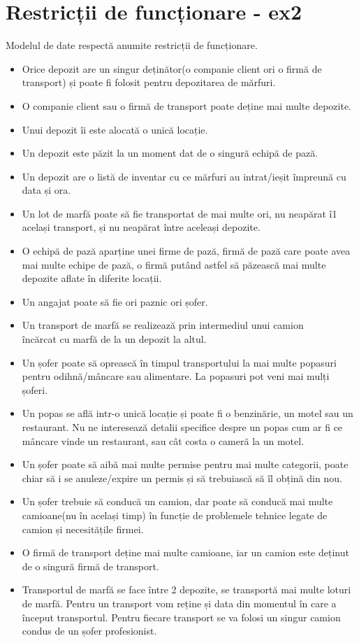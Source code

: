 \documentclass[12pt, a4paper]{article}
\begin{document}
\section{Restricții de funcționare - ex2}
\quad \par
Modelul de date respectă anumite restricții de funcționare.
\begin{itemize}
    \item Orice depozit are un singur deținător(o companie client ori o firmă de transport) și poate fi folosit pentru depozitarea de mărfuri.
    \item O companie client sau o firmă de transport poate deține mai multe depozite.
    \item Unui depozit îi este alocată o unică locație.
    \item Un depozit este păzit la un moment dat de o singură echipă de pază.
    \item Un depozit are o listă de inventar cu ce mărfuri au intrat/ieșit împreună cu data și ora.
    \item Un lot de marfă poate să fie transportat de mai multe ori, nu neapărat î1 același transport, și nu neapărat între aceleași depozite.
    \item O echipă de pază aparține unei firme de pază, firmă de pază care poate avea mai multe echipe de pază, o firmă putând astfel să păzească mai multe depozite aflate în diferite locații.
    \item Un angajat poate să fie ori paznic ori șofer.
    \item Un transport de marfă se realizează prin intermediul unui camion \\încărcat cu marfă de la un depozit la altul.
    \item Un șofer poate să oprească în timpul transportului la mai multe popasuri pentru odihnă/mâncare sau alimentare. La popasuri pot veni mai mulți șoferi.
    \item Un popas se află intr-o unică locație și poate fi o benzinărie, un motel sau un restaurant. Nu ne interesează detalii specifice despre un popas cum ar fi ce mâncare vinde un restaurant, sau cât costa o cameră la un motel.
    \item Un șofer poate să aibă mai multe permise pentru mai multe categorii, poate chiar să i se anuleze/expire un permis și să trebuiască să îl obțină din nou.
    \item Un șofer trebuie să conducă un camion, dar poate să conducă mai multe camioane(nu în același timp) în funcție de problemele tehnice legate de camion și necesitățile firmei.
    \item O firmă de transport deține mai multe camioane, iar un camion este deținut de o singură firmă de transport.
    \item Transportul de marfă se face între 2 depozite, se transportă mai multe loturi de marfă. Pentru un transport vom reține și data din momentul în care a început transportul. Pentru fiecare transport se va folosi un singur camion condus de un șofer profesionist.
\end{itemize}
\end{document}
